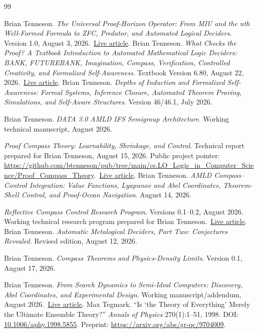 \documentclass[11pt]{article}
\theoremstyle{definition}
\theoremstyle{remark}
\begin{document}
\begin{thebibliography}{99}

Brian Tenneson.
\emph{The Universal Proof-Horizon Operator: From MIU and the nth Well-Formed Formula to ZFC, Predator, and Automated Logical Deciders}.
Version 1.0, August 3, 2026.\ \href{https://btenneson.github.io/pub/papers/universal_proof_horizon_operator/}{Live article}.
Brian Tenneson.
\emph{What Checks the Proof? A Textbook Introduction to Automated Mathematical Logic Deciders: BANK, FUTUREBANK, Imagination, Compass, Verification, Controlled Creativity, and Formalized Self-Awareness}.
Textbook Version 6.80, August 22, 2026.\ \href{https://btenneson.github.io/pub/papers/what_checks_the_proof_v6_80/}{Live article}.
Brian Tenneson.
\emph{Depths of Induction and Formalized Self-Awareness: Formal Systems, Inference Closure, Automated Theorem Proving, Simulations, and Self-Aware Structures}.
Version 46/46.1, July 2026.

Brian Tenneson.
\emph{DATA 3.0 AMLD IFS Semigroup Architecture}.
Working technical manuscript, August 2026.

\emph{Proof Compass Theory: Learnability, Shrinkage, and Control}.
Technical report prepared for Brian Tenneson, August 15, 2026.
Public project pointer: \url{https://github.com/btenneson/pub/tree/main/cs.LO_Logic_in_Computer_Science/Proof_Compass_Theory}.\ \href{https://btenneson.github.io/pub/papers/proof_compass_theory/}{Live article}.
Brian Tenneson.
\emph{AMLD Compass--Control Integration: Value Functions, Lyapunov and Abel Coordinates, Theorem-Shell Control, and Proof-Ocean Navigation}.
August 14, 2026.

\emph{Reflective Compass Control Research Program}.
Versions 0.1--0.2, August 2026. Working technical research program prepared for Brian Tenneson.\ \href{https://btenneson.github.io/pub/papers/reflective_compass_control_v0_2/}{Live article}.
Brian Tenneson.
\emph{Automatic Metalogical Deciders, Part Two: Conjectures Revealed}.
Revised edition, August 12, 2026.

Brian Tenneson.
\emph{Compass Theorems and Physics-Density Limits}.
Version 0.1, August 17, 2026.

Brian Tenneson.
\emph{From Search Dynamics to Semi-Ideal Computers: Discovery, Abel Coordinates, and Experimental Design}.
Working manuscript/addendum, August 2026.\ \href{https://btenneson.github.io/pub/papers/search_dynamics_abel_v0_4/}{Live article}.
Max Tegmark.
``Is `the Theory of Everything' Merely the Ultimate Ensemble Theory?''
\emph{Annals of Physics} 270(1):1--51, 1998.
DOI: \href{https://doi.org/10.1006/aphy.1998.5855}{10.1006/aphy.1998.5855}.
Preprint: \url{https://arxiv.org/abs/gr-qc/9704009}.


\end{thebibliography}
\end{document}
